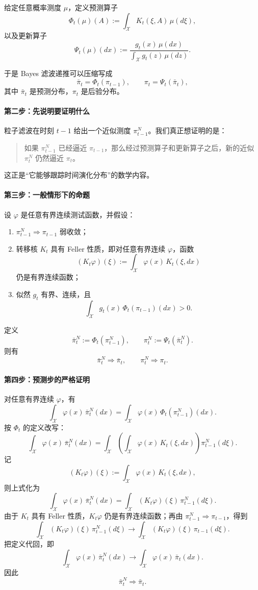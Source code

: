\documentclass[12pt,a4paper]{ctexart}
\begin{document}
给定任意概率测度 \(\mu\)，定义预测算子
\[
\Phi_t(\mu)(A)
:=
\int_{\mathcal X} K_t(\xi,A)\,\mu(d\xi),
\]
以及更新算子
\[
\Psi_t(\mu)(dx)
:=
\frac{g_t(x)\,\mu(dx)}
{\int_{\mathcal X} g_t(z)\,\mu(dz)}.
\]

于是 Bayes 滤波递推可以压缩写成
\[
\bar\pi_t = \Phi_t(\pi_{t-1}),
\qquad
\pi_t = \Psi_t(\bar\pi_t),
\]
其中 \(\bar\pi_t\) 是预测分布，\(\pi_t\) 是后验分布。

\paragraph{第二步：先说明要证明什么}
粒子滤波在时刻 \(t-1\) 给出一个近似测度 \(\pi_{t-1}^N\)。我们真正想证明的是：
\begin{quote}
如果 \(\pi_{t-1}^N\) 已经逼近 \(\pi_{t-1}\)，那么经过预测算子和更新算子之后，新的近似 \(\pi_t^N\) 仍然逼近 \(\pi_t\)。
\end{quote}
这正是“它能够跟踪时间演化分布”的数学内容。

\paragraph{第三步：一般情形下的命题}
设 \(\varphi\) 是任意有界连续测试函数，并假设：
\begin{enumerate}
  \item \(\pi_{t-1}^N \Rightarrow \pi_{t-1}\) 弱收敛；
  \item 转移核 \(K_t\) 具有 Feller 性质，即对任意有界连续 \(\varphi\)，函数
  \[
  (K_t\varphi)(\xi)
  :=
  \int_{\mathcal X}\varphi(x)\,K_t(\xi,dx)
  \]
  仍是有界连续函数；
  \item 似然 \(g_t\) 有界、连续，且
  \[
  \int_{\mathcal X} g_t(x)\,\Phi_t(\pi_{t-1})(dx) > 0.
  \]
\end{enumerate}
定义
\[
\bar\pi_t^N := \Phi_t(\pi_{t-1}^N),
\qquad
\pi_t^N := \Psi_t(\bar\pi_t^N).
\]
则有
\[
\bar\pi_t^N \Rightarrow \bar\pi_t,
\qquad
\pi_t^N \Rightarrow \pi_t.
\]

\paragraph{第四步：预测步的严格证明}
对任意有界连续 \(\varphi\)，有
\[
\int_{\mathcal X}\varphi(x)\,\bar\pi_t^N(dx)
=
\int_{\mathcal X}\varphi(x)\,\Phi_t(\pi_{t-1}^N)(dx).
\]
按 \(\Phi_t\) 的定义改写：
\[
\int_{\mathcal X}\varphi(x)\,\bar\pi_t^N(dx)
=
\int_{\mathcal X}
\left(
\int_{\mathcal X}\varphi(x)\,K_t(\xi,dx)
\right)
\pi_{t-1}^N(d\xi).
\]
记
\[
(K_t\varphi)(\xi)
:=
\int_{\mathcal X}\varphi(x)\,K_t(\xi,dx),
\]
则上式化为
\[
\int_{\mathcal X}\varphi(x)\,\bar\pi_t^N(dx)
=
\int_{\mathcal X}(K_t\varphi)(\xi)\,\pi_{t-1}^N(d\xi).
\]
由于 \(K_t\) 具有 Feller 性质，\(K_t\varphi\) 仍是有界连续函数；再由
\(\pi_{t-1}^N \Rightarrow \pi_{t-1}\)，得到
\[
\int_{\mathcal X}(K_t\varphi)(\xi)\,\pi_{t-1}^N(d\xi)
\to
\int_{\mathcal X}(K_t\varphi)(\xi)\,\pi_{t-1}(d\xi).
\]
把定义代回，即
\[
\int_{\mathcal X}\varphi(x)\,\bar\pi_t^N(dx)
\to
\int_{\mathcal X}\varphi(x)\,\bar\pi_t(dx).
\]
因此
\[
\bar\pi_t^N \Rightarrow \bar\pi_t.
\]
\end{document}
